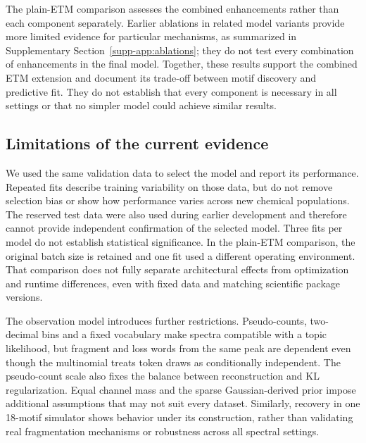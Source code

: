 \documentclass[10pt,a4paper]{article}
\begin{document}
The plain-ETM comparison assesses the combined enhancements rather than
each component separately. Earlier ablations in related model variants
provide more limited evidence for particular mechanisms, as summarized in
Supplementary Section~\ref{supp-app:ablations}; they do not test every combination of enhancements
in the final model. Together, these results support the combined ETM extension
and document its trade-off between motif discovery and predictive fit.
They do not establish that every component is necessary in all settings or
that no simpler model could achieve similar results.

\subsection{Limitations of the current evidence}

We used the same validation data to select the model and report its performance.
Repeated fits describe training variability on those data, but do not remove
selection bias or show how performance varies across new chemical populations.
The reserved test data were also used during earlier development and therefore
cannot provide independent confirmation of the selected model. Three fits
per model do not establish statistical significance. In the plain-ETM comparison,
the original batch size is retained and one fit used a different operating
environment. That comparison does not fully separate architectural effects
from optimization and runtime differences, even with fixed data and matching
scientific package versions.

The observation model introduces further restrictions. Pseudo-counts,
two-decimal bins and a fixed vocabulary make spectra compatible with a topic
likelihood, but fragment and loss words from the same peak are dependent
even though the multinomial treats token draws as conditionally independent.
The pseudo-count scale also fixes the balance between reconstruction and
KL regularization.
Equal channel mass and the sparse Gaussian-derived prior impose additional
assumptions that may not suit every dataset. Similarly, recovery in one
18-motif simulator shows behavior under its construction, rather than validating
real fragmentation mechanisms or robustness across all spectral settings.
\end{document}
